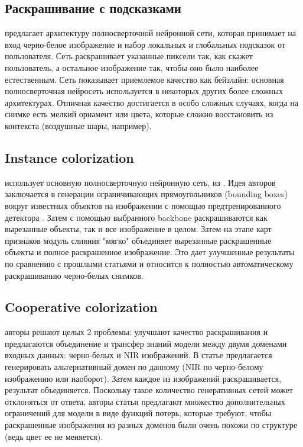\documentclass[14pt]{article}
\begin{document}
\subsection{Раскрашивание с подсказками}
\cite{GuidedImageColorization} предлагает архитектуру полносверточной нейронной сети, которая принимает на вход
черно-белое изображение и набор локальных и глобальных подсказок от пользователя. Сеть раскрашивает указанные пиксели так, как
скажет пользователь, а остальное изображение так, чтобы оно было наиболее естественным. Сеть показывает приемлемое качество
как бейзлайн: основная полносверточная нейросеть используется в некоторых других более сложных архитектурах. Отличная качество достигается
в особо сложных случаях, когда на снимке есть мелкий орнамент или цвета, которые сложно восстановить из контекста (воздушные шары, например).

\subsection{Instance colorization}
\cite{InstaColor} использует основную полносверточную нейронную сеть, из \cite{GuidedImageColorization}. Идея авторов заключается в генерации
ограничивающих прямоугольников (bounding boxes) вокруг известных объектов на изображении с помощью предтренированного детектора \cite{MaskCNN}.
Затем с помощью выбранного backbone раскрашиваются как вырезанные объекты, так и все изображение в целом. Затем на этапе карт признаков
модуль слияния "мягко" объединяет вырезанные раскрашенные объекты и полное раскрашенное изображение. Это дает улучшенные результаты по сравнению с прошлыми статьями
и относится к полностью автоматическому раскрашиванию черно-белых снимков.

\subsection{Cooperative colorization}
\cite{CoColor} авторы решают целых 2 проблемы: улучшают качество раскрашивания и предлагаются объединение и трансфер знаний модели между двумя доменами входных данных:
черно-белых и NIR изображений. В статье предлагается генерировать альтернативный домен по данному (NIR по черно-белому изображению или наоборот). Затем каждое
из изображений раскрашивается, результат объединяется. Поскольку такое количество генеративных сетей может отклоняться от ответа, авторы статьи предлагают множество дополнительных
ограничений для модели в виде функций потерь, которые требуют, чтобы раскрашенные изображения из разных доменов были очень похожи по структуре (ведь цвет ее не меняется).
\end{document}
